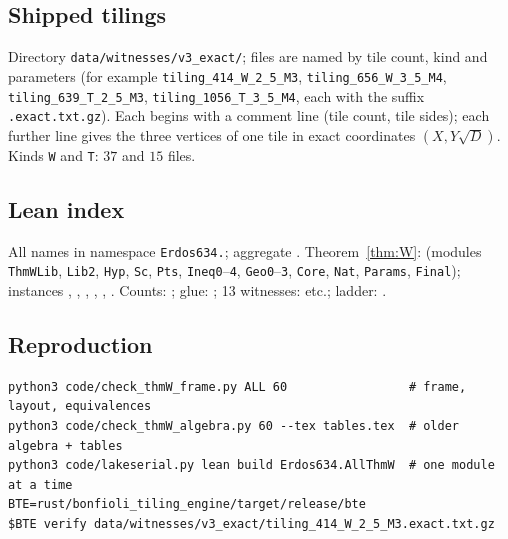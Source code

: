 \documentclass[11pt,reqno]{amsart}
\theoremstyle{plain}
\theoremstyle{definition}
\begin{document}
\subsection{Shipped tilings}
Directory \texttt{data/witnesses/v3\_exact/}; files are named by tile count, kind and parameters (for example \texttt{tiling\_414\_W\_2\_5\_M3}, \texttt{tiling\_656\_W\_3\_5\_M4}, \texttt{tiling\_639\_T\_2\_5\_M3}, \texttt{tiling\_1056\_T\_3\_5\_M4}, each with the suffix \texttt{.exact.txt.gz}). Each begins with a comment line (tile count, tile sides); each further line gives the three vertices of one tile in exact coordinates $(X,Y\sqrt D)$. Kinds \texttt{W} and \texttt{T}: $37$ and $15$ files.
\subsection{Lean index}
All names in namespace \texttt{Erdos634.}; aggregate . Theorem~\ref{thm:W}:  (modules \texttt{ThmWLib}, \texttt{Lib2}, \texttt{Hyp}, \texttt{Sc}, \texttt{Pts}, \texttt{Ineq0}--\texttt{4}, \texttt{Geo0}--\texttt{3}, \texttt{Core}, \texttt{Nat}, \texttt{Params}, \texttt{Final}); instances , , , , , . Counts: ; glue: ; 13 witnesses:  etc.; ladder: .
\subsection{Reproduction}
\begin{verbatim}
python3 code/check_thmW_frame.py ALL 60                 # frame, layout, equivalences
python3 code/check_thmW_algebra.py 60 --tex tables.tex  # older algebra + tables
python3 code/lakeserial.py lean build Erdos634.AllThmW  # one module at a time
BTE=rust/bonfioli_tiling_engine/target/release/bte
$BTE verify data/witnesses/v3_exact/tiling_414_W_2_5_M3.exact.txt.gz
\end{verbatim}
\end{document}
